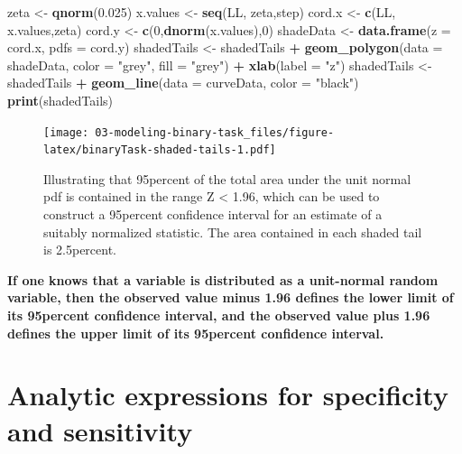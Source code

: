 \documentclass[
]{book}
\newenvironment{Shaded}{\begin{snugshade}}{\end{snugshade}}
\newcommand{\DataTypeTok}[1]{\textcolor[rgb]{0.13,0.29,0.53}{#1}}
\newcommand{\DecValTok}[1]{\textcolor[rgb]{0.00,0.00,0.81}{#1}}
\newcommand{\FloatTok}[1]{\textcolor[rgb]{0.00,0.00,0.81}{#1}}
\newcommand{\KeywordTok}[1]{\textcolor[rgb]{0.13,0.29,0.53}{\textbf{#1}}}
\newcommand{\NormalTok}[1]{#1}
\newcommand{\OperatorTok}[1]{\textcolor[rgb]{0.81,0.36,0.00}{\textbf{#1}}}
\newcommand{\StringTok}[1]{\textcolor[rgb]{0.31,0.60,0.02}{#1}}
\begin{document}
\begin{Shaded}
\begin{Highlighting}[]
\NormalTok{zeta \textless{}{-}}\StringTok{ }\KeywordTok{qnorm}\NormalTok{(}\FloatTok{0.025}\NormalTok{)}
\NormalTok{x.values \textless{}{-}}\StringTok{ }\KeywordTok{seq}\NormalTok{(LL, zeta,step)}
\NormalTok{cord.x \textless{}{-}}\StringTok{ }\KeywordTok{c}\NormalTok{(LL, x.values,zeta) }
\NormalTok{cord.y \textless{}{-}}\StringTok{ }\KeywordTok{c}\NormalTok{(}\DecValTok{0}\NormalTok{,}\KeywordTok{dnorm}\NormalTok{(x.values),}\DecValTok{0}\NormalTok{) }
\NormalTok{shadeData \textless{}{-}}\StringTok{ }\KeywordTok{data.frame}\NormalTok{(}\DataTypeTok{z =}\NormalTok{ cord.x, }\DataTypeTok{pdfs =}\NormalTok{ cord.y)}
\NormalTok{shadedTails \textless{}{-}}\StringTok{ }\NormalTok{shadedTails }\OperatorTok{+}\StringTok{ }\KeywordTok{geom\_polygon}\NormalTok{(}\DataTypeTok{data =}\NormalTok{ shadeData, }\DataTypeTok{color =} \StringTok{"grey"}\NormalTok{, }\DataTypeTok{fill =} \StringTok{"grey"}\NormalTok{) }\OperatorTok{+}\StringTok{ }\KeywordTok{xlab}\NormalTok{(}\DataTypeTok{label =} \StringTok{"z"}\NormalTok{) }
\NormalTok{shadedTails \textless{}{-}}\StringTok{ }\NormalTok{shadedTails }\OperatorTok{+}\StringTok{ }\KeywordTok{geom\_line}\NormalTok{(}\DataTypeTok{data =}\NormalTok{ curveData, }\DataTypeTok{color =} \StringTok{"black"}\NormalTok{)}
\KeywordTok{print}\NormalTok{(shadedTails)}
\end{Highlighting}
\end{Shaded}

\begin{figure}
\centering
\texttt{[image: 03-modeling-binary-task\_files/figure-latex/binaryTask-shaded-tails-1.pdf]}
\caption{\label{fig:binaryTask-shaded-tails}Illustrating that 95percent of the total area under the unit normal pdf is contained in the range \textbar Z\textbar{} \textless{} 1.96, which can be used to construct a 95percent confidence interval for an estimate of a suitably normalized statistic. The area contained in each shaded tail is 2.5percent.}
\end{figure}

\textbf{If one knows that a variable is distributed as a unit-normal random variable, then the observed value minus 1.96 defines the lower limit of its 95percent confidence interval, and the observed value plus 1.96 defines the upper limit of its 95percent confidence interval.}

\hypertarget{analytic-expressions-for-specificity-and-sensitivity}{%
\section{Analytic expressions for specificity and sensitivity}\label{analytic-expressions-for-specificity-and-sensitivity}}
\end{document}
